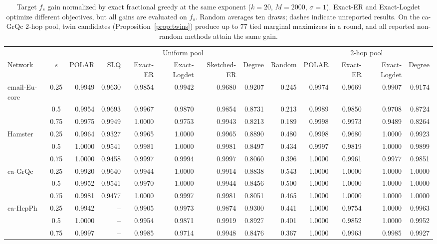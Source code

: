 \documentclass[conference]{IEEEtran}
\theoremstyle{definition}
\newcommand{\POLAR}{\textsc{POLAR}}
\begin{document}
\begin{table}[!t]
\centering
\caption{Target $f_s$ gain normalized by exact fractional greedy at the
same exponent ($k=20$, $M=2000$, $\sigma=1$). Exact-ER and
Exact-Logdet optimize different objectives, but all gains are
evaluated on $f_s$. Random averages ten draws; dashes indicate
unreported results. On the ca-GrQc 2-hop pool, twin candidates
(Proposition~\ref{prop:twins}) produce up to 77 tied marginal
maximizers in a round, and all reported non-random methods
attain the same gain.}
\label{tab:exact}
\footnotesize
\setlength{\tabcolsep}{3.9pt}
\renewcommand{\arraystretch}{1.06}
\begin{tabular}{@{}lc rrrrrrr@{\hspace{3\tabcolsep}}rrrr@{}}
\toprule
& & \multicolumn{7}{c}{Uniform pool} & \multicolumn{4}{c}{2-hop pool}\\
\cmidrule(lr){3-9}\cmidrule(lr){10-13}
Network & $s$ & \POLAR{} & SLQ & Exact-ER & Exact-Logdet & Sketched-ER & Degree & Random
& \POLAR{} & Exact-ER & Exact-Logdet & Degree\\
\midrule
email-Eu-core & 0.25 & 0.9949 & 0.9630 & 0.9854 & 0.9942 & 0.9680 & 0.9207 & 0.245 & 0.9974 & 0.9669 & 0.9907 & 0.9174\\
 & 0.5 & 0.9954 & 0.9693 & 0.9967 & 0.9870 & 0.9854 & 0.8731 & 0.213 & 0.9989 & 0.9850 & 0.9708 & 0.8724\\
 & 0.75 & 0.9975 & 0.9949 & 1.0000 & 0.9753 & 0.9943 & 0.8213 & 0.189 & 0.9998 & 0.9973 & 0.9489 & 0.8264\\
\midrule
Hamster & 0.25 & 0.9964 & 0.9327 & 0.9965 & 1.0000 & 0.9965 & 0.8890 & 0.480 & 0.9998 & 0.9680 & 1.0000 & 0.9923\\
 & 0.5 & 1.0000 & 0.9541 & 0.9981 & 1.0000 & 0.9981 & 0.8497 & 0.434 & 0.9997 & 0.9819 & 1.0000 & 0.9899\\
 & 0.75 & 1.0000 & 0.9458 & 0.9997 & 0.9994 & 0.9997 & 0.8060 & 0.396 & 1.0000 & 0.9961 & 0.9977 & 0.9851\\
\midrule
ca-GrQc & 0.25 & 0.9920 & 0.9640 & 0.9944 & 1.0000 & 0.9914 & 0.8838 & 0.543 & 1.0000 & 1.0000 & 1.0000 & 1.0000\\
 & 0.5 & 0.9952 & 0.9541 & 0.9970 & 1.0000 & 0.9944 & 0.8456 & 0.500 & 1.0000 & 1.0000 & 1.0000 & 1.0000\\
 & 0.75 & 0.9981 & 0.9477 & 1.0000 & 0.9997 & 0.9981 & 0.8051 & 0.465 & 1.0000 & 1.0000 & 1.0000 & 1.0000\\
\midrule
ca-HepPh & 0.25 & 0.9942 & -- & 0.9905 & 0.9973 & 0.9874 & 0.9300 & 0.441 & 1.0000 & 0.9754 & 1.0000 & 0.9963\\
 & 0.5 & 1.0000 & -- & 0.9954 & 0.9871 & 0.9919 & 0.8927 & 0.401 & 1.0000 & 0.9852 & 1.0000 & 0.9952\\
 & 0.75 & 0.9997 & -- & 0.9985 & 0.9714 & 0.9948 & 0.8476 & 0.367 & 1.0000 & 0.9963 & 0.9985 & 0.9927\\
\bottomrule
\end{tabular}
\end{table}
\end{document}
